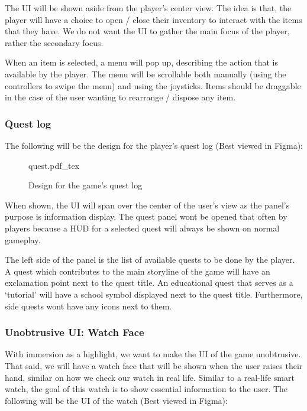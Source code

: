 \documentclass[
  11pt, %
]{assignment}
\begin{document}
The UI will be shown aside from the player's center view. The idea is that, the player will have a choice to open / close their inventory to interact with the items that they have. We do not want the UI to gather the main focus of the player, rather the secondary focus.

When an item is selected, a menu will pop up, describing the action that is available by the player. The menu will be scrollable both manually (using the controllers to swipe the menu) and using the joysticks. Items should be draggable in the case of the user wanting to rearrange / dispose any item.

\subsubsection*{Quest log}

The following will be the design for the player's quest log (Best viewed in Figma):

\begin{figure}[ht]
  \centering
  \def\svgwidth{\linewidth}
  {quest.pdf_tex}
  \caption{Design for the game's quest log}
\end{figure}

When shown, the UI will span over the center of the user's view as the panel's purpose is information display. The quest panel wont be opened that often by players because a HUD for a selected quest will always be shown on normal gameplay.

The left side of the panel is the list of available quests to be done by the player. A quest which contributes to the main storyline of the game will have an exclamation point next to the quest title. An educational quest that serves as a `tutorial' will have a school symbol displayed next to the quest title. Furthermore, side quests wont have any icons next to them.

\subsubsection*{Unobtrusive UI\@: Watch Face}

With immersion as a highlight, we want to make the UI of the game unobtrusive. That said, we will have a watch face that will be shown when the user raises their hand, similar on how we check our watch in real life. Similar to a real-life smart watch, the goal of this watch is to show essential information to the user. The following will be the UI of the watch (Best viewed in Figma):
\end{document}
